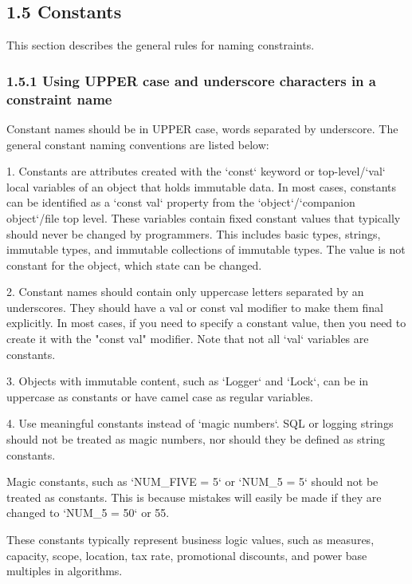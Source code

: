 \subsection*{\textbf{1.5 Constants}}

\label{sec:1.5}

This section describes the general rules for naming constraints.

\subsubsection*{\textbf{1.5.1 Using UPPER case and underscore characters in a constraint name}}
\leavevmode\newline

\label{sec:1.5.1}

Constant names should be in UPPER case, words separated by underscore. The general constant naming conventions are listed below:

1. Constants are attributes created with the `const` keyword or top-level/`val` local variables of an object that holds immutable data. In most cases, constants can be identified as a `const val` property from the `object`/`companion object`/file top level. These variables contain fixed constant values that typically should never be changed by programmers. This includes basic types, strings, immutable types, and immutable collections of immutable types. The value is not constant for the object, which state can be changed.

2. Constant names should contain only uppercase letters separated by an underscores. They should have a val or const val modifier to make them final explicitly. In most cases, if you need to specify a constant value, then you need to create it with the "const val" modifier. Note that not all `val` variables are constants.

3. Objects with immutable content, such as `Logger` and `Lock`, can be in uppercase as constants or have camel case as regular variables.

4. Use meaningful constants instead of `magic numbers`. SQL or logging strings should not be treated as magic numbers, nor should they be defined as string constants.

Magic constants, such as `NUM_FIVE = 5` or `NUM_5 = 5` should not be treated as constants. This is because mistakes will easily be made if they are changed to `NUM_5 = 50` or 55.

These constants typically represent business logic values, such as measures, capacity, scope, location, tax rate, promotional discounts, and power base multiples in algorithms.

